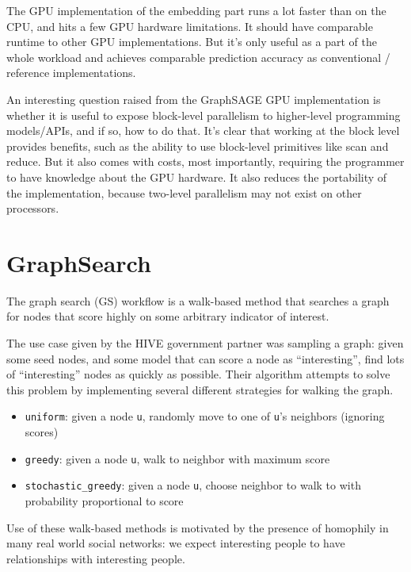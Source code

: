 \documentclass[10pt,oneside]{memoir}
\providecommand{\tightlist}{%
  \setlength{\itemsep}{0pt}\setlength{\parskip}{0pt}}
\begin{document}
The GPU implementation of the embedding part runs a lot faster than on
the CPU, and hits a few GPU hardware limitations. It should have
comparable runtime to other GPU implementations. But it's only useful as
a part of the whole workload and achieves comparable prediction accuracy
as conventional / reference implementations.

An interesting question raised from the GraphSAGE GPU implementation is
whether it is useful to expose block-level parallelism to higher-level
programming models/APIs, and if so, how to do that. It's clear that
working at the block level provides benefits, such as the ability to use
block-level primitives like scan and reduce. But it also comes with
costs, most importantly, requiring the programmer to have knowledge
about the GPU hardware. It also reduces the portability of the
implementation, because two-level parallelism may not exist on other
processors.

\hypertarget{graphsearch-1}{%
\chapter{GraphSearch}\label{graphsearch-1}}

The graph search (GS) workflow is a walk-based method that searches a
graph for nodes that score highly on some arbitrary indicator of
interest.

The use case given by the HIVE government partner was sampling a graph:
given some seed nodes, and some model that can score a node as
``interesting'', find lots of ``interesting'' nodes as quickly as
possible. Their algorithm attempts to solve this problem by implementing
several different strategies for walking the graph.

\begin{itemize}
\tightlist
\item
  \texttt{uniform}: given a node \texttt{u}, randomly move to one of
  \texttt{u}'s neighbors (ignoring scores)
\item
  \texttt{greedy}: given a node \texttt{u}, walk to neighbor with
  maximum score
\item
  \texttt{stochastic\_greedy}: given a node \texttt{u}, choose neighbor
  to walk to with probability proportional to score
\end{itemize}

Use of these walk-based methods is motivated by the presence of
homophily in many real world social networks: we expect interesting
people to have relationships with interesting people.
\end{document}
